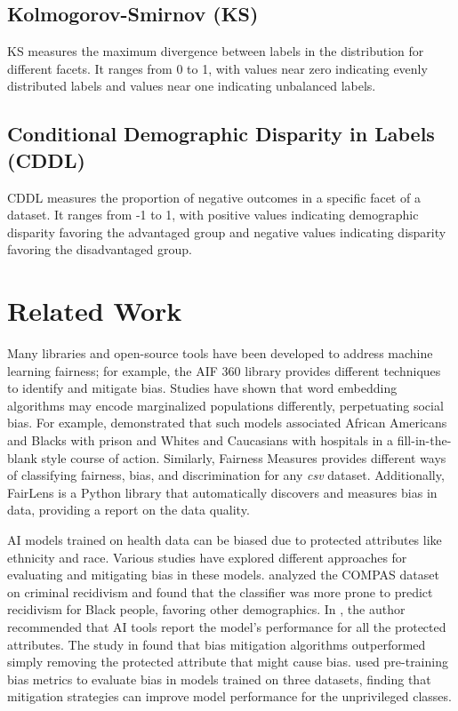 \documentclass[12pt]{article}
\begin{document}
\subsection{Kolmogorov-Smirnov (KS)}
KS measures the maximum divergence between labels in the distribution for different facets. It ranges from 0 to 1, with values near zero indicating evenly distributed labels and values near one indicating unbalanced labels.

\subsection{Conditional Demographic Disparity in Labels (CDDL)}
CDDL measures the proportion of negative outcomes in a specific facet of a dataset. It ranges from -1 to 1, with positive values indicating demographic disparity favoring the advantaged group and negative values indicating disparity favoring the disadvantaged group.

\section{Related Work}
Many libraries and open-source tools have been developed to address machine learning fairness; for example, the AIF 360 library \cite{Bellamy2018} provides different techniques to identify and mitigate bias. Studies have shown that word embedding algorithms may encode marginalized populations differently, perpetuating social bias. For example, \cite{Zhang2020} demonstrated that such models associated African Americans and Blacks with prison and Whites and Caucasians with hospitals in a fill-in-the-blank style course of action. 
Similarly, Fairness Measures \cite{Zehlike2017} provides different ways of classifying fairness, bias, and discrimination for any \textit{csv} dataset.
Additionally, FairLens \cite{fairlens} is a Python library that automatically discovers and measures bias in data, providing a report on the data quality.

AI models trained on health data can be biased due to protected attributes like ethnicity and race. 
Various studies have explored different approaches for evaluating and mitigating bias in these models. 
\cite {Lopes} analyzed the COMPAS dataset on criminal recidivism and found that the classifier was more prone to predict recidivism for Black people, favoring other demographics. 
In \cite{Noseworthy2020}, the author recommended that AI tools report the model's performance for all the protected attributes.
The study in \cite{Park2021} found that bias mitigation algorithms outperformed simply removing the protected attribute that might cause bias.
\cite{Mandhala2022} used pre-training bias metrics to evaluate bias in models trained on three datasets, finding that mitigation strategies can improve model performance for the unprivileged classes. 
\end{document}

